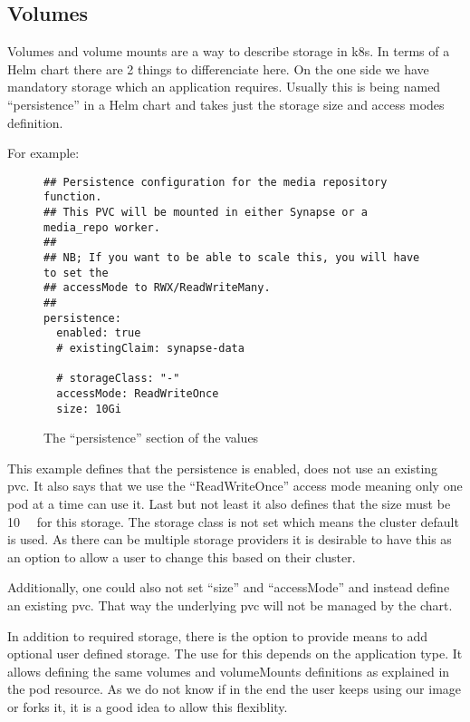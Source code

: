 \subsection{Volumes}

Volumes and volume mounts are a way to describe storage in \gls{k8s}.
In terms of a Helm chart there are 2 things to differenciate here.
On the one side we have mandatory storage which an application requires.
Usually this is being named \enquote{persistence} in a Helm chart and takes just the storage size and access modes definition.

For example:

\begin{figure}[h]
\begin{verbatim}
## Persistence configuration for the media repository function.
## This PVC will be mounted in either Synapse or a media_repo worker.
##
## NB; If you want to be able to scale this, you will have to set the
## accessMode to RWX/ReadWriteMany.
##
persistence:
  enabled: true
  # existingClaim: synapse-data

  # storageClass: "-"
  accessMode: ReadWriteOnce
  size: 10Gi
\end{verbatim}
\caption{The \enquote{persistence} section of the \gls{values}}\label{code:persistence_section}
\end{figure}

This example defines that the persistence is enabled, does not use an existing \Gls{pvc}.
It also says that we use the \enquote{ReadWriteOnce} access mode meaning only one pod at a time can use it\cite{KubernetesPersistentVolume}.
Last but not least it also defines that the size must be \qty{10}{\giga\byte} for this storage.
The storage class is not set which means the cluster default is used. 
As there can be multiple storage providers it is desirable to have this as an option to allow a user to change this based on their cluster.

Additionally, one could also not set \enquote{size} and \enquote{accessMode} and instead define an existing \gls{pvc}.
That way the underlying \gls{pvc} will not be managed by the chart.
\bigskip

In addition to required storage, there is the option to provide means to add optional user defined storage.
The use for this depends on the application type.
It allows defining the same volumes and volumeMounts definitions as explained\cite{Pods} in the \gls{pod} resource.
As we do not know if in the end the user keeps using our image or forks it, it is a good idea to allow this flexiblity.

